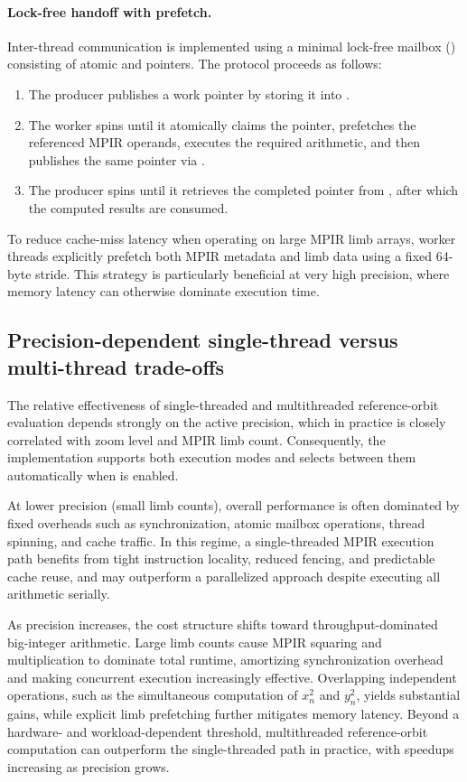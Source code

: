 \paragraph{Lock-free handoff with prefetch.}
Inter-thread communication is implemented using a minimal lock-free mailbox
() consisting of atomic  and 
pointers.  The protocol proceeds as follows:
\begin{enumerate}
  \item The producer publishes a work pointer by storing it into .
  \item The worker spins until it atomically claims the pointer, prefetches the
        referenced MPIR operands, executes the required arithmetic, and then
        publishes the same pointer via .
  \item The producer spins until it retrieves the completed pointer from
        , after which the computed results are consumed.
\end{enumerate}
To reduce cache-miss latency when operating on large MPIR limb arrays, worker
threads explicitly prefetch both MPIR metadata and limb data using a fixed
64-byte stride.  This strategy is particularly beneficial at very high
precision, where memory latency can otherwise dominate execution time.

\subsection{Precision-dependent single-thread versus multi-thread trade-offs}
\label{subsec:ref-orbit-mt-tradeoff}

The relative effectiveness of single-threaded and multithreaded reference-orbit
evaluation depends strongly on the active precision, which in practice is
closely correlated with zoom level and MPIR limb count.  Consequently, the
implementation supports both execution modes and selects between them
automatically when  is enabled.

At lower precision (small limb counts), overall performance is often dominated
by fixed overheads such as synchronization, atomic mailbox operations, thread
spinning, and cache traffic.  In this regime, a single-threaded MPIR execution
path benefits from tight instruction locality, reduced fencing, and predictable
cache reuse, and may outperform a parallelized approach despite executing all
arithmetic serially.

As precision increases, the cost structure shifts toward throughput-dominated
big-integer arithmetic.  Large limb counts cause MPIR squaring and multiplication
to dominate total runtime, amortizing synchronization overhead and making
concurrent execution increasingly effective.  Overlapping independent
operations, such as the simultaneous computation of \(x_n^2\) and \(y_n^2\),
yields substantial gains, while explicit limb prefetching further mitigates
memory latency.  Beyond a hardware- and workload-dependent threshold,
multithreaded reference-orbit computation can outperform the
single-threaded path in practice, with speedups increasing as precision grows.

